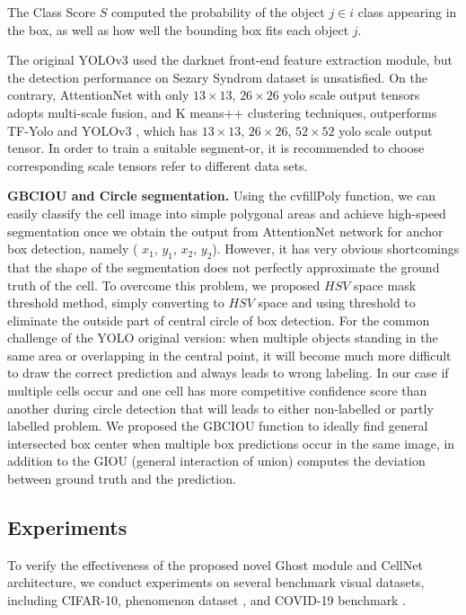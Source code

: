The Class Score $S$ computed the probability of the object $j \in  i$ class appearing in the box, as well as how well the bounding box fits each object $j$.

The original YOLOv3\cite{33} used the darknet front-end feature extraction module, but the detection performance on Sezary Syndrom dataset is unsatisfied. On the contrary, AttentionNet with only $13 \times 13$, $26 \times 26$ yolo scale output tensors adopts multi-scale fusion, and K means++ clustering\cite{18} techniques, outperforms TF-Yolo\cite{18} and  YOLOv3 \cite{33}, which has $13 \times 13$, $26 \times 26$, $52 \times 52$ yolo scale output tensor. In order to train a suitable segment-or, it is recommended to choose corresponding scale tensors refer to different data sets. 

\textbf{GBCIOU and Circle segmentation.} Using the cvfillPoly function, we can easily classify the cell image into simple polygonal areas and achieve high-speed segmentation once we obtain the output from AttentionNet network for anchor box detection, namely ( $x_{1}$, $y_{1}$, $x_{2}$, $y_{2}$). However, it has very obvious shortcomings that the shape of the segmentation does not perfectly approximate the ground truth of the cell. To overcome this problem, we proposed $HSV$ space mask threshold method, simply converting to $HSV$ space and using threshold to eliminate the outside part of central circle of box detection.  For the common challenge of the YOLO original version: when multiple objects standing in the same area or overlapping in the central point, it will become much more difficult to draw the correct prediction and always leads to wrong labeling. In our case if multiple cells occur and one cell has more competitive confidence score than another during circle detection that will leads to either non-labelled or partly labelled problem.
We proposed the GBCIOU function to ideally find general intersected box center when multiple box predictions occur in the same image, in addition to the GIOU (general interaction of union) computes the deviation between ground truth and the prediction.



\subsection{Experiments}
To verify the effectiveness of the proposed novel Ghost module and CellNet architecture, we conduct experiments on several benchmark visual datasets, including CIFAR-10\cite{21}, phenomenon dataset \cite{38}, and COVID-19 benchmark \cite{36}\cite{37}. 


